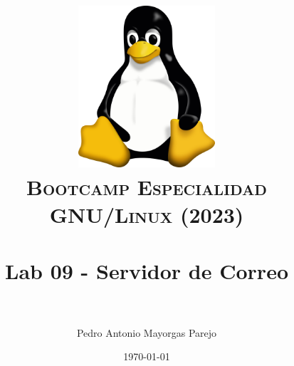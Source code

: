 

\graphicspath{ {img/} }

\title{
\normalfont \normalsize
\includegraphics[width=6cm,height=6cm]{logo}\\
\textsc{\textbf{Bootcamp Especialidad GNU/Linux (2023)}} \\ [25pt] %
\horrule{0.5pt} \\[0.4cm] %
\huge Lab 09 - Servidor de Correo \\ %
\horrule{2pt} \\[0.5cm] %
}



\author{Pedro Antonio Mayorgas Parejo} %

\date{\normalsize\today} %




\maketitle %

\newpage %

\tableofcontents %

\newpage


